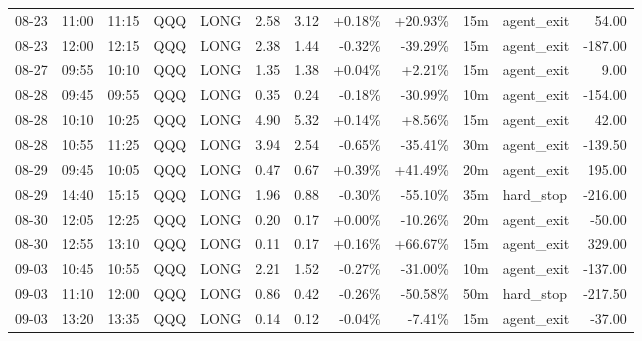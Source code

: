 \documentclass[11pt,a4paper]{article}
\begin{document}
\begin{center}
\begin{longtable}{>{\color{txtmain}}l l l l l r r r r r >{\color{txtmain}}l r}
08-23 & 11:00 & 11:15 & QQQ & LONG & 2.58 & 3.12 & \textcolor{wingreen}{+0.18\%} & \textcolor{wingreen}{+20.93\%} & 15m & agent\_exit & \textcolor{wingreen}{54.00} \\
08-23 & 12:00 & 12:15 & QQQ & LONG & 2.38 & 1.44 & \textcolor{lossred}{-0.32\%} & \textcolor{lossred}{-39.29\%} & 15m & agent\_exit & \textcolor{lossred}{-187.00} \\
08-27 & 09:55 & 10:10 & QQQ & LONG & 1.35 & 1.38 & \textcolor{wingreen}{+0.04\%} & \textcolor{wingreen}{+2.21\%} & 15m & agent\_exit & \textcolor{wingreen}{9.00} \\
08-28 & 09:45 & 09:55 & QQQ & LONG & 0.35 & 0.24 & \textcolor{lossred}{-0.18\%} & \textcolor{lossred}{-30.99\%} & 10m & agent\_exit & \textcolor{lossred}{-154.00} \\
08-28 & 10:10 & 10:25 & QQQ & LONG & 4.90 & 5.32 & \textcolor{wingreen}{+0.14\%} & \textcolor{wingreen}{+8.56\%} & 15m & agent\_exit & \textcolor{wingreen}{42.00} \\
08-28 & 10:55 & 11:25 & QQQ & LONG & 3.94 & 2.54 & \textcolor{lossred}{-0.65\%} & \textcolor{lossred}{-35.41\%} & 30m & agent\_exit & \textcolor{lossred}{-139.50} \\
08-29 & 09:45 & 10:05 & QQQ & LONG & 0.47 & 0.67 & \textcolor{wingreen}{+0.39\%} & \textcolor{wingreen}{+41.49\%} & 20m & agent\_exit & \textcolor{wingreen}{195.00} \\
08-29 & 14:40 & 15:15 & QQQ & LONG & 1.96 & 0.88 & \textcolor{lossred}{-0.30\%} & \textcolor{lossred}{-55.10\%} & 35m & hard\_stop & \textcolor{lossred}{-216.00} \\
08-30 & 12:05 & 12:25 & QQQ & LONG & 0.20 & 0.17 & \textcolor{wingreen}{+0.00\%} & \textcolor{lossred}{-10.26\%} & 20m & agent\_exit & \textcolor{lossred}{-50.00} \\
08-30 & 12:55 & 13:10 & QQQ & LONG & 0.11 & 0.17 & \textcolor{wingreen}{+0.16\%} & \textcolor{wingreen}{+66.67\%} & 15m & agent\_exit & \textcolor{wingreen}{329.00} \\
09-03 & 10:45 & 10:55 & QQQ & LONG & 2.21 & 1.52 & \textcolor{lossred}{-0.27\%} & \textcolor{lossred}{-31.00\%} & 10m & agent\_exit & \textcolor{lossred}{-137.00} \\
09-03 & 11:10 & 12:00 & QQQ & LONG & 0.86 & 0.42 & \textcolor{lossred}{-0.26\%} & \textcolor{lossred}{-50.58\%} & 50m & hard\_stop & \textcolor{lossred}{-217.50} \\
09-03 & 13:20 & 13:35 & QQQ & LONG & 0.14 & 0.12 & \textcolor{lossred}{-0.04\%} & \textcolor{lossred}{-7.41\%} & 15m & agent\_exit & \textcolor{lossred}{-37.00} \\

\end{longtable}
\end{center}
\end{document}
